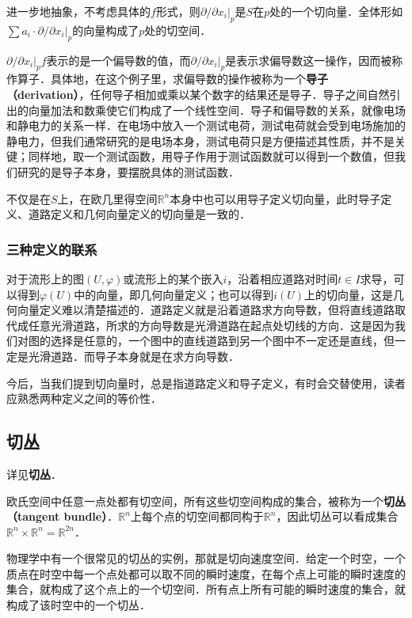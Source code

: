 进一步地抽象，不考虑具体的$f$形式，则$\partial/\partial x_i|_{p}$是$S$在$p$处的一个切向量．全体形如$\sum a_i\cdot\partial/\partial x_i|_{p}$的向量构成了$p$处的切空间．

$\partial/\partial x_i|_{p}f$表示的是一个偏导数的值，而$\partial/\partial x_i|_{p}$是表示求偏导数这一操作，因而被称作算子．具体地，在这个例子里，求偏导数的操作被称为一个\textbf{导子（derivation）}，任何导子相加或乘以某个数字的结果还是导子．导子之间自然引出的向量加法和数乘使它们构成了一个线性空间．导子和偏导数的关系，就像电场和静电力的关系一样．在电场中放入一个测试电荷，测试电荷就会受到电场施加的静电力，但我们通常研究的是电场本身，测试电荷只是方便描述其性质，并不是关键；同样地，取一个测试函数，用导子作用于测试函数就可以得到一个数值，但我们研究的是导子本身，要摆脱具体的测试函数．

不仅是在$S$上，在欧几里得空间$\mathbb{R}^n$本身中也可以用导子定义切向量，此时导子定义、道路定义和几何向量定义的切向量是一致的．

\subsubsection{三种定义的联系}

对于流形上的图$(U,\varphi)$或流形上的某个嵌入$i$，沿着相应道路对时间$t\in I$求导，可以得到$\varphi(U)$中的向量，即几何向量定义；也可以得到$i(U)$上的切向量，这是几何向量定义难以清楚描述的．道路定义就是沿着道路求方向导数，但将直线道路取代成任意光滑道路，所求的方向导数是光滑道路在起点处切线的方向．这是因为我们对图的选择是任意的，一个图中的直线道路到另一个图中不一定还是直线，但一定是光滑道路．而导子本身就是在求方向导数．

今后，当我们提到切向量时，总是指道路定义和导子定义，有时会交替使用，读者应熟悉两种定义之间的等价性．

\subsection{切丛}
详见\textbf{切丛}．

欧氏空间中任意一点处都有切空间，所有这些切空间构成的集合，被称为一个\textbf{切丛（tangent bundle）}．$\mathbb{R}^n$上每个点的切空间都同构于$\mathbb{R}^n$，因此切丛可以看成集合$\mathbb{R}^n\times\mathbb{R}^n=\mathbb{R}^{2n}$．

物理学中有一个很常见的切丛的实例，那就是切向速度空间．给定一个时空，一个质点在时空中每一个点处都可以取不同的瞬时速度，在每个点上可能的瞬时速度的集合，就构成了这个点上的一个切空间．所有点上所有可能的瞬时速度的集合，就构成了该时空中的一个切丛．









